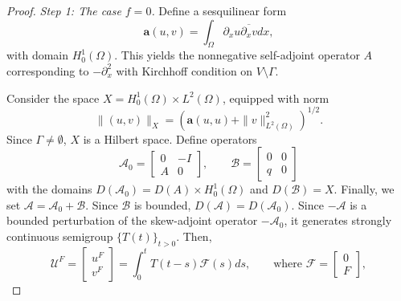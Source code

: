 \documentclass[11pt]{amsart}
\newcommand{\HOX}[1]{\marginpar{\footnotesize #1}}
\theoremstyle{definition}
\theoremstyle{plain}
\numberwithin{equation}{section}
\begin{document}

\begin{proof}
    \emph{Step 1: The case $f=0$.} Define a sesquilinear form
    \begin{equation*}
        \mathbf{a}(u,v) = \int_\Omega \partial_x u \overline{\partial_x v} dx,
    \end{equation*}
    with domain $H_0^1(\Omega)$. This yields the nonnegative self-adjoint operator $A$ corresponding to $-\partial_x^2$ with Kirchhoff condition on $V\setminus\Gamma$.

    Consider the space $X = H_0^1(\Omega) \times L^2(\Omega)$, equipped with norm
    \begin{equation*}
        \|(u,v)\|_X = \left(\mathbf{a}(u,u) + \|v\|_{L^2(\Omega)}^2\right)^{1/2}.
    \end{equation*}
    Since $\Gamma \neq \emptyset$, $X$ is a Hilbert space. Define operators 
    \begin{equation*}
        \mathcal{A}_0 = 
        \begin{bmatrix}
            0 & -I\\
            A & 0
        \end{bmatrix},
        \qquad
        \mathcal{B} = 
        \begin{bmatrix}
            0 & 0\\
            q & 0
        \end{bmatrix}
    \end{equation*}
    with the domains $D(\mathcal{A}_0) = D(A)\times H_0^1(\Omega)$ and $D(\mathcal{B}) = X$. Finally, we set $\mathcal{A} = \mathcal{A}_0+ \mathcal{B}$. Since $\mathcal{B}$ is bounded, $D(\mathcal{A}) = D(\mathcal{A}_0)$. Since $-\mathcal{A}$ is a bounded perturbation of the skew-adjoint operator $-\mathcal{A}_0$, it generates strongly continuous semigroup $\{T(t)\}_{t>0}$. Then,
    \begin{equation*}
        \mathcal{U}^F = 
        \begin{bmatrix}
            u^F\\v^F
        \end{bmatrix}
        = \int_0^t T(t - s) \mathcal{F}(s)ds,
        \qquad
        \text{where } 
        \mathcal{F} =
        \begin{bmatrix}
            0\\
            F
        \end{bmatrix},

\end{equation*}
\end{proof}
\end{document}
